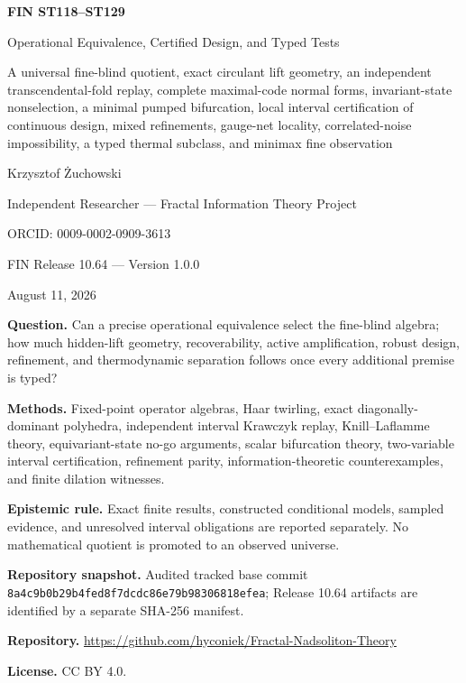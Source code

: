 \documentclass[11pt,a4paper]{article}
\begin{document}
\begin{titlepage}
\centering
\vspace*{1.0cm}
{\LARGE\bfseries FIN ST118--ST129\par}
\vspace{0.32cm}
{\Large Operational Equivalence, Certified Design, and Typed Tests\par}
\vspace{0.42cm}
{\large A universal fine-blind quotient, exact circulant lift geometry, an independent transcendental-fold replay, complete maximal-code normal forms, invariant-state nonselection, a minimal pumped bifurcation, local interval certification of continuous design, mixed refinements, gauge-net locality, correlated-noise impossibility, a typed thermal subclass, and minimax fine observation\par}
\vspace{0.82cm}
{\Large Krzysztof \.{Z}uchowski\par}
\vspace{0.20cm}
{\large Independent Researcher --- Fractal Information Theory Project\par}
{\large ORCID: 0009-0002-0909-3613\par}
\vspace{0.62cm}
{\large FIN Release 10.64 --- Version 1.0.0\par}
{\large August 11, 2026\par}
\vfill
\begin{minipage}{0.91\textwidth}
\textbf{Question.} Can a precise operational equivalence select the fine-blind algebra; how much hidden-lift geometry, recoverability, active amplification, robust design, refinement, and thermodynamic separation follows once every additional premise is typed?\par
\textbf{Methods.} Fixed-point operator algebras, Haar twirling, exact diagonally-dominant polyhedra, independent interval Krawczyk replay, Knill--Laflamme theory, equivariant-state no-go arguments, scalar bifurcation theory, two-variable interval certification, refinement parity, information-theoretic counterexamples, and finite dilation witnesses.\par
\textbf{Epistemic rule.} Exact finite results, constructed conditional models, sampled evidence, and unresolved interval obligations are reported separately. No mathematical quotient is promoted to an observed universe.\par
\textbf{Repository snapshot.} Audited tracked base commit \texttt{8a4c9b0b29b4fed8f7dcdc86e79b98306818efea}; Release 10.64 artifacts are identified by a separate SHA-256 manifest.\par
\textbf{Repository.} \url{https://github.com/hyconiek/Fractal-Nadsoliton-Theory}\par
\textbf{License.} CC BY 4.0.
\end{minipage}
\end{titlepage}
\end{document}
